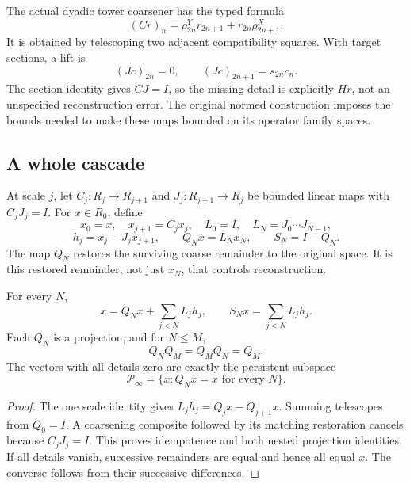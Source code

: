 The actual dyadic tower coarsener has the typed formula
\begin{equation}\label{eq:dyadic}
 (Cr)_n=\rho^Y_{2n}r_{2n+1}+r_{2n}\rho^X_{2n+1}.
\end{equation}
It is obtained by telescoping two adjacent compatibility squares. With target sections, a lift is
\[
 (Jc)_{2n}=0,\qquad (Jc)_{2n+1}=s_{2n}c_n.
\]
The section identity gives \(CJ=I\), so the missing detail is explicitly \(Hr\), not an unspecified reconstruction error. The original normed construction imposes the bounds needed to make these maps bounded on its operator family spaces.

\subsection{A whole cascade}
At scale \(j\), let \(C_j:R_j\to R_{j+1}\) and \(J_j:R_{j+1}\to R_j\) be bounded linear maps with \(C_jJ_j=I\). For \(x\in R_0\), define
\[
 x_0=x,\quad x_{j+1}=C_jx_j,\quad
 L_0=I,\quad L_N=J_0\cdots J_{N-1},
\]
\[
 h_j=x_j-J_jx_{j+1},\qquad Q_Nx=L_Nx_N,
 \qquad S_N=I-Q_N.
\]
The map \(Q_N\) restores the surviving coarse remainder to the original space. It is this restored remainder, not just \(x_N\), that controls reconstruction.

\begin{theorem}\label{KS26}
For every \(N\),
\[
 x=Q_Nx+\sum_{j<N}L_jh_j,
 \qquad S_Nx=\sum_{j<N}L_jh_j.
\]
Each \(Q_N\) is a projection, and for \(N\le M\),
\[
 Q_NQ_M=Q_MQ_N=Q_M.
\]
The vectors with all details zero are exactly the persistent subspace
\[
 \mathcal P_\infty=\{x:Q_Nx=x\text{ for every }N\}.
\]
\end{theorem}
\begin{proof}
The one scale identity gives \(L_jh_j=Q_jx-Q_{j+1}x\). Summing telescopes from \(Q_0=I\). A coarsening composite followed by its matching restoration cancels because \(C_jJ_j=I\). This proves idempotence and both nested projection identities. If all details vanish, successive remainders are equal and hence all equal \(x\). The converse follows from their successive differences.
\end{proof}


